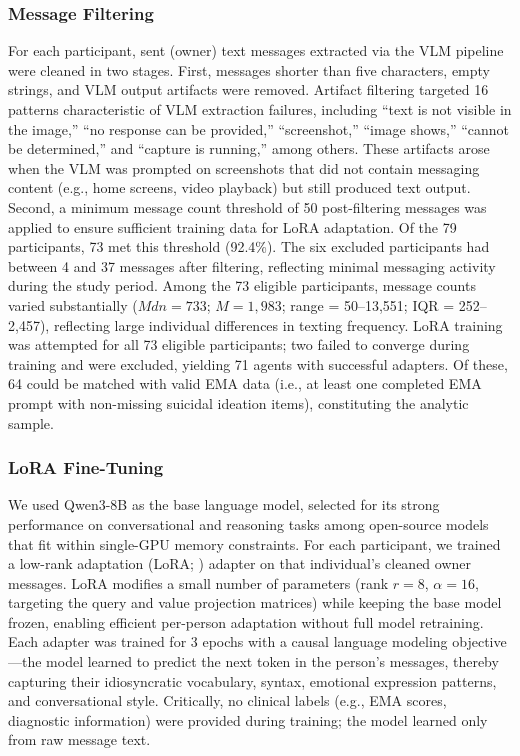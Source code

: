 \documentclass[review,12pt,authoryear]{elsarticle}
\begin{document}
\subsubsection{Message Filtering}

For each participant, sent (owner) text messages extracted via the VLM pipeline were cleaned in two stages. First, messages shorter than five characters, empty strings, and VLM output artifacts were removed. Artifact filtering targeted 16 patterns characteristic of VLM extraction failures, including ``text is not visible in the image,'' ``no response can be provided,'' ``screenshot,'' ``image shows,'' ``cannot be determined,'' and ``capture is running,'' among others. These artifacts arose when the VLM was prompted on screenshots that did not contain messaging content (e.g., home screens, video playback) but still produced text output. Second, a minimum message count threshold of 50 post-filtering messages was applied to ensure sufficient training data for LoRA adaptation. Of the 79 participants, 73 met this threshold (92.4\%). The six excluded participants had between 4 and 37 messages after filtering, reflecting minimal messaging activity during the study period. Among the 73 eligible participants, message counts varied substantially ($Mdn = 733$; $M = 1{,}983$; range = 50--13,551; IQR = 252--2,457), reflecting large individual differences in texting frequency. LoRA training was attempted for all 73 eligible participants; two failed to converge during training and were excluded, yielding 71 agents with successful adapters. Of these, 64 could be matched with valid EMA data (i.e., at least one completed EMA prompt with non-missing suicidal ideation items), constituting the analytic sample.



\subsubsection{LoRA Fine-Tuning}

We used Qwen3-8B \citep{qwen2025qwen3} as the base language model, selected for its strong performance on conversational and reasoning tasks among open-source models that fit within single-GPU memory constraints. For each participant, we trained a low-rank adaptation (LoRA; \citealt{hu2022lora}) adapter on that individual's cleaned owner messages. LoRA modifies a small number of parameters (rank $r = 8$, $\alpha = 16$, targeting the query and value projection matrices) while keeping the base model frozen, enabling efficient per-person adaptation without full model retraining. Each adapter was trained for 3 epochs with a causal language modeling objective---the model learned to predict the next token in the person's messages, thereby capturing their idiosyncratic vocabulary, syntax, emotional expression patterns, and conversational style. Critically, no clinical labels (e.g., EMA scores, diagnostic information) were provided during training; the model learned only from raw message text.
\end{document}
